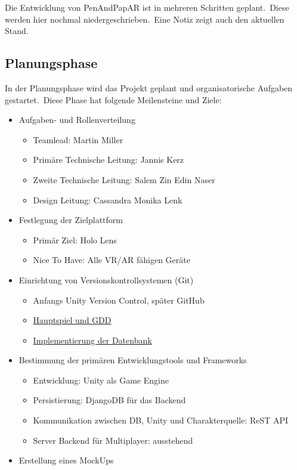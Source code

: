 Die Entwicklung von PenAndPapAR ist in mehreren Schritten geplant.\ Diese werden hier nochmal niedergeschrieben.\ Eine
Notiz zeigt auch den aktuellen Stand.

\subsection{Planungsphase}\label{subsec:planning}
In der Planungsphase wird das Projekt geplant und organisatorische Aufgaben gestartet.\ Diese Phase hat folgende
Meilensteine und Ziele:

\begin{itemize}
    \item Aufgaben- und Rollenverteilung
    \begin{itemize}
        \item Teamlead: Martin Miller
        \item Primäre Technische Leitung: Jannis Kerz
        \item Zweite Technische Leitung: Salem Zin Edin Naser
        \item Design Leitung: Cassandra Monika Lenk
    \end{itemize}
    \item Festlegung der Zielplattform
    \begin{itemize}
        \item Primär Ziel: Holo Lens
        \item Nice To Have: Alle VR/AR fähigen Geräte
    \end{itemize}
    \item Einrichtung von Versionskontrollsystemen (Git)
    \begin{itemize}
        \item Anfangs Unity Version Control, später GitHub
        \item \href{https://github.com/Sc1p1o/PenAndPapARGDD}{Hauptspiel und GDD}
        \item \href{https://github.com/Sc1p1o/PenAndPapARDB}{Implementierung der Datenbank}
    \end{itemize}
    \item Bestimmung der primären Entwicklungstools und Frameworks
    \begin{itemize}
        \item Entwicklung: Unity als Game Engine
        \item Persistierung: DjangoDB für das Backend
        \item Kommunikation zwischen DB, Unity und Charakterquelle: ReST API
        \item Server Backend für Multiplayer: ausstehend
    \end{itemize}
    \item Erstellung eines MockUps
\end{itemize}

